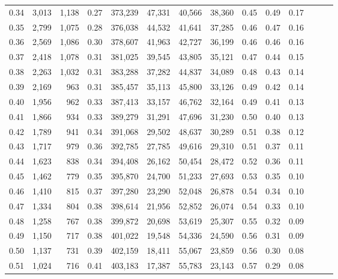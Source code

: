 \begin{tabular}{rrrrrrrrrrrrrr}
0.34 &   3,013 &  1,138 &  0.27 &  373,239 &   47,331 &  40,566 &  38,360 &  0.45 &  0.49 &      0.17 \\
0.35 &   2,799 &  1,075 &  0.28 &  376,038 &   44,532 &  41,641 &  37,285 &  0.46 &  0.47 &      0.16 \\
0.36 &   2,569 &  1,086 &  0.30 &  378,607 &   41,963 &  42,727 &  36,199 &  0.46 &  0.46 &      0.16 \\
0.37 &   2,418 &  1,078 &  0.31 &  381,025 &   39,545 &  43,805 &  35,121 &  0.47 &  0.44 &      0.15 \\
0.38 &   2,263 &  1,032 &  0.31 &  383,288 &   37,282 &  44,837 &  34,089 &  0.48 &  0.43 &      0.14 \\
0.39 &   2,169 &    963 &  0.31 &  385,457 &   35,113 &  45,800 &  33,126 &  0.49 &  0.42 &      0.14 \\
0.40 &   1,956 &    962 &  0.33 &  387,413 &   33,157 &  46,762 &  32,164 &  0.49 &  0.41 &      0.13 \\
0.41 &   1,866 &    934 &  0.33 &  389,279 &   31,291 &  47,696 &  31,230 &  0.50 &  0.40 &      0.13 \\
0.42 &   1,789 &    941 &  0.34 &  391,068 &   29,502 &  48,637 &  30,289 &  0.51 &  0.38 &      0.12 \\
0.43 &   1,717 &    979 &  0.36 &  392,785 &   27,785 &  49,616 &  29,310 &  0.51 &  0.37 &      0.11 \\
0.44 &   1,623 &    838 &  0.34 &  394,408 &   26,162 &  50,454 &  28,472 &  0.52 &  0.36 &      0.11 \\
0.45 &   1,462 &    779 &  0.35 &  395,870 &   24,700 &  51,233 &  27,693 &  0.53 &  0.35 &      0.10 \\
0.46 &   1,410 &    815 &  0.37 &  397,280 &   23,290 &  52,048 &  26,878 &  0.54 &  0.34 &      0.10 \\
0.47 &   1,334 &    804 &  0.38 &  398,614 &   21,956 &  52,852 &  26,074 &  0.54 &  0.33 &      0.10 \\
0.48 &   1,258 &    767 &  0.38 &  399,872 &   20,698 &  53,619 &  25,307 &  0.55 &  0.32 &      0.09 \\
0.49 &   1,150 &    717 &  0.38 &  401,022 &   19,548 &  54,336 &  24,590 &  0.56 &  0.31 &      0.09 \\
0.50 &   1,137 &    731 &  0.39 &  402,159 &   18,411 &  55,067 &  23,859 &  0.56 &  0.30 &      0.08 \\
0.51 &   1,024 &    716 &  0.41 &  403,183 &   17,387 &  55,783 &  23,143 &  0.57 &  0.29 &      0.08 \\

\end{tabular}
